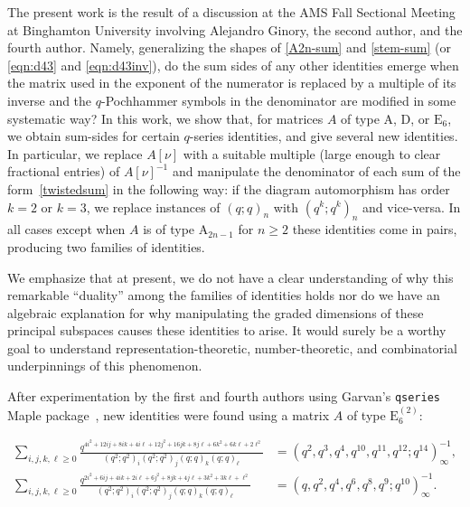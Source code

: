 \documentclass[ALCO,Unicode,published]{cedram}
\begin{document}
The present work is the result of a discussion at the AMS Fall Sectional Meeting at Binghamton University involving Alejandro Ginory, the second author, and the fourth author. Namely, generalizing the shapes of \eqref{A2n-sum} and \eqref{stem-sum} (or \eqref{eqn:d43} and \eqref{eqn:d43inv}), do the sum sides of any other identities emerge when the matrix used in the exponent of the numerator is replaced by a multiple of its inverse and the $q$-Pochhammer symbols in the denominator are modified in some systematic way?
In this work, we show that, for matrices $A$ of type $\mathrm{A}$, $\mathrm{D}$, or $\mathrm{E}_6$, we obtain sum-sides for certain $q$-series identities, and give several new identities. In particular, we replace $A[\nu]$ with a suitable multiple (large enough to clear fractional entries) of $A[\nu]^{-1}$ and manipulate the denominator of each sum of the form~\eqref{twistedsum} in the following way: if the diagram automorphism has order $k=2$ or $k=3$, we replace instances of $(q;q)_n$ with $(q^k;q^k)_n$ and vice-versa. In all cases except when $A$ is of type $\mathrm{A}_{2n-1}$ for $n \ge 2$ these identities come in pairs, producing two families of identities.

We emphasize that at present, we do not have a clear understanding of why this remarkable ``duality'' among the families of identities holds nor do we have an algebraic explanation for why manipulating the graded dimensions of these principal subspaces causes these identities to arise. It would surely be a worthy goal to understand representation-theoretic, number-theoretic, and combinatorial underpinnings of this phenomenon. 

After experimentation by the first and fourth authors using Garvan's \texttt{qseries} Maple package~\cite{Ga}, new identities were found using a matrix $A$ of type $\mathrm{E}_6^{(2)}$:

\begin{align}
\sum_{i,j,k,\ell \ge 0}
\frac{q^{4i^2 + 12 ij + 8ik + 4i\ell + 12j^2 + 16jk + 8j\ell + 6k^2+6k\ell+2\ell^2}}
{\left(q^2;q^2\right)_i\left(q^2;q^2\right)_j\left(q;q\right)_k\left(q;q\right)_\ell}
&= \left(q^2,q^3,q^4,q^{10},q^{11},q^{12};q^{14}\right)^{-1}_\infty \label{eqn:Nandi_intro}, \\ 
\sum_{i,j,k,\ell \ge 0}
\frac{q^{2i^2 + 6 ij + 4ik + 2i\ell + 6j^2 + 8 jk + 4 j\ell + 3k^2+3k\ell+\ell^2}}
{\left(q^2;q^2\right)_i\left(q^2;q^2\right)_j\left(q;q\right)_k\left(q;q\right)_\ell} 
&=\left(q,q^2,q^4,q^6,q^8,q^9;q^{10}\right)^{-1}_\infty\label{eqn:mod10_intro}.
\end{align}
\end{document}
